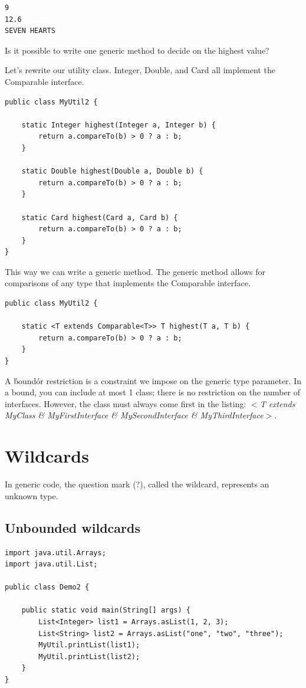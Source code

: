 \begin{verbatim}
9
12.6
SEVEN HEARTS
\end{verbatim}

Is it possible to write one generic method to decide on the highest value?

Let's rewrite our utility class.  Integer, Double, and Card all implement the Comparable interface. 

\begin{lstlisting}
public class MyUtil2 {

	static Integer highest(Integer a, Integer b) {
		return a.compareTo(b) > 0 ? a : b;
	}

	static Double highest(Double a, Double b) {
		return a.compareTo(b) > 0 ? a : b;
	}

	static Card highest(Card a, Card b) {
		return a.compareTo(b) > 0 ? a : b;
	}
}
\end{lstlisting}

This way we can write a generic method.  The generic method allows for comparisons of any type that implements the Comparable interface. 

\begin{lstlisting}
public class MyUtil2 {

	static <T extends Comparable<T>> T highest(T a, T b) {
		return a.compareTo(b) > 0 ? a : b;
	}
}
\end{lstlisting}


A \'bound\' or restriction is a constraint we impose on the generic type parameter.
In a bound, you can include at most 1 class; there is no restriction on the number of interfaces.  However, the class must always come first in the listing:
\textit{
$<$T extends MyClass \& MyFirstInterface \& MySecondInterface \& MyThirdInterface$>$}.

\section{Wildcards}

In generic code,  the question mark (?),  called the wildcard,  represents an unknown type.

\subsection{Unbounded wildcards}

\begin{lstlisting}
import java.util.Arrays;
import java.util.List;

public class Demo2 {

	public static void main(String[] args) {
		List<Integer> list1 = Arrays.asList(1, 2, 3);
		List<String> list2 = Arrays.asList("one", "two", "three");
		MyUtil.printList(list1);
		MyUtil.printList(list2);
	}
}
\end{lstlisting}

